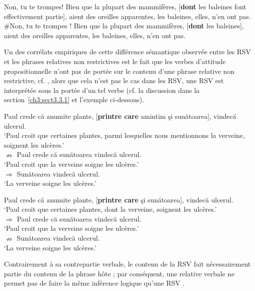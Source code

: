 \ea \label{ch3:ex102}
\ea 
Non, tu te trompes! Bien que la plupart des mammifères, [\textbf{dont} les baleines font effectivement partie], aient des oreilles apparentes, les baleines, elles, n’en ont pas. \label{ch3:ex102a} 
\ex
\#Non, tu te trompes ! Bien que la plupart des mammifères, [\textbf{dont} les baleines], aient des oreilles apparentes, les baleines, elles, n’en ont pas. \label{ch3:ex102b} 
\z 
\z 

Un des corrélats empiriques de cette différence sémantique observée entre les RSV et les phrases relatives non restrictives est le fait que les verbes d’attitude propositionnelle n’ont pas de portée sur le contenu d’une phrase relative non restrictive, cf. , alors que cela n’est pas le cas dans les RSV, {\cad} une RSV est interprétée sous la portée d’un tel verbe (cf. la discussion dans la section~\ref{ch3:sect3.3.1} et l’exemple  ci-dessous). 

\ea \label{ch3:ex103}
\ea 
Paul crede că anumite plante, [\textbf{printre care} amintim şi sunătoarea], vindecă ulcerul. \\
\glt ‘Paul croit que certaines plantes, parmi lesquelles nous mentionnons la verveine, soignent les ulcères.’ \\
\ex ${\nRightarrow}$ Paul crede că sunătoarea vindecă ulcerul. \\
\glt ‘Paul croit que la verveine soigne les ulcères.’\\
\ex ${\Rightarrow}$ Sunătoarea vindecă ulcerul.\\
\glt ‘La verveine soigne les ulcères.’
\z 
\z 

\ea \label{ch3:ex104} 
\ea 
Paul crede că anumite plante, [\textbf{printre care} şi sunătoarea], vindecă ulcerul. \\
\glt ‘Paul croit que certaines plantes, dont la verveine, soignent les ulcères.’\\
\ex ${\Rightarrow}$ Paul crede că sunătoarea vindecă ulcerul.\\
\glt ‘Paul croit que la verveine soigne les ulcères.’\\
\ex ${\nRightarrow}$ Sunătoarea vindecă ulcerul.\\
\glt ‘La verveine soigne les ulcères.’
\z 
\z

Contrairement à sa contrepartie verbale, le contenu de la RSV fait nécessairement partie du contenu de la phrase hôte ; par conséquent, une relative verbale   ne permet pas de faire la même inférence logique qu’une RSV . 

